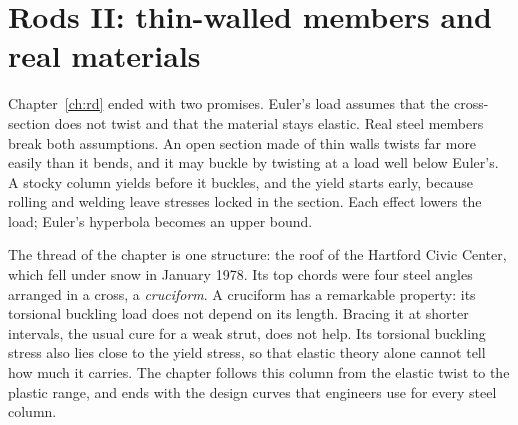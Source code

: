\chapter{Rods II: thin-walled members and real materials}\label{ch:tw}
Chapter~\ref{ch:rd} ended with two promises. Euler's load assumes that the cross-section
does not twist and that the material stays elastic. Real steel members break both
assumptions. An open section made of thin walls twists far more easily than it bends, and
it may buckle by twisting at a load well below Euler's. A stocky column yields before it
buckles, and the yield starts early, because rolling and welding leave stresses locked in
the section. Each effect lowers the load; Euler's hyperbola becomes an upper bound.

The thread of the chapter is one structure: the roof of the Hartford Civic Center, which fell
under snow in January 1978. Its top chords were four steel angles arranged in a cross, a
\emph{cruciform}. A cruciform has a remarkable property: its torsional buckling load does not
depend on its length. Bracing it at shorter intervals, the usual cure for a weak strut, does
not help. Its torsional buckling stress also lies close to the yield stress, so that elastic
theory alone cannot tell how much it carries. The chapter follows this column from the
elastic twist to the plastic range, and ends with the design curves that engineers use for
every steel column.


